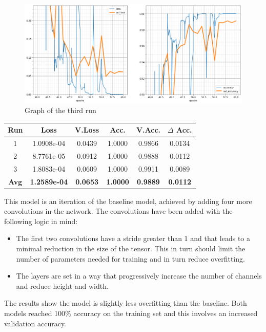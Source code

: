 \begin{figure}[H]
	\begin{center}
	\includegraphics[width=\linewidth]{Immagini/conv-3}
	\caption{Graph of the third run}
	\end{center}
\end{figure}
\begin{table}[H]
	\centering
	\begin{tabular}{cccccc}
		\textbf{Run} &\textbf{Loss}&\textbf{V.Loss} &\textbf{Acc.}&\textbf{V.Acc.}&\textbf{$\Delta$ Acc.} \\ \hline
		1   & 1.0908e-04    &   0.0439  & 1.0000    & 0.9866    & 0.0134 \\
		2   & 8.7761e-05    &   0.0912  & 1.0000    & 0.9888    & 0.0112 \\
		3   & 1.8083e-04    &   0.0609  & 1.0000    & 0.9911    & 0.0089 \\
		\textbf{Avg} & \textbf{1.2589e-04} & \textbf{0.0653}	& \textbf{1.0000}	& \textbf{0.9889} 	& \textbf{0.0112} 
	\end{tabular}
\end{table}

This model is an iteration of the baseline model, achieved by adding four more convolutions in the network. The convolutions have been added with the following logic in mind:
\begin{itemize}
\item The first two convolutions have a stride greater than 1 and that leads to a minimal reduction in the size of the tensor. This in turn should limit the number of parameters needed for training and in turn reduce overfitting.
\item The layers are set in a way that progressively increase the number of channels and reduce height and width.
\end{itemize}
The results show the model is slightly less overfitting than the baseline. Both models reached 100\% accuracy on the training set and this involves an increased validation accuracy.



